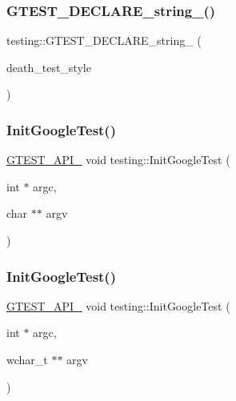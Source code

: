 \mbox{\label{namespacetesting_a37b7e87f0a5f502c6918f37d1768c1f3}} 
\subsubsection{\texorpdfstring{G\+T\+E\+S\+T\+\_\+\+D\+E\+C\+L\+A\+R\+E\+\_\+string\+\_\+()}{GTEST\_DECLARE\_string\_()}}
{\footnotesize\ttfamily testing\+::\+G\+T\+E\+S\+T\+\_\+\+D\+E\+C\+L\+A\+R\+E\+\_\+string\+\_\+ (\begin{DoxyParamCaption}\item[{death\+\_\+test\+\_\+style}]{ }\end{DoxyParamCaption})}

\mbox{\label{namespacetesting_aee3f6f99df893f576f705f66c0559482}} 
\subsubsection{\texorpdfstring{Init\+Google\+Test()}{InitGoogleTest()}\hspace{0.1cm}{\footnotesize\ttfamily [1/3]}}
{\footnotesize\ttfamily \hyperlink{gtest-port_8h_aa73be6f0ba4a7456180a94904ce17790}{G\+T\+E\+S\+T\+\_\+\+A\+P\+I\+\_\+} void testing\+::\+Init\+Google\+Test (\begin{DoxyParamCaption}\item[{int $\ast$}]{argc,  }\item[{char $\ast$$\ast$}]{argv }\end{DoxyParamCaption})}

\mbox{\label{namespacetesting_a6e9d83553f1d10818d698d45689d8adb}} 
\subsubsection{\texorpdfstring{Init\+Google\+Test()}{InitGoogleTest()}\hspace{0.1cm}{\footnotesize\ttfamily [2/3]}}
{\footnotesize\ttfamily \hyperlink{gtest-port_8h_aa73be6f0ba4a7456180a94904ce17790}{G\+T\+E\+S\+T\+\_\+\+A\+P\+I\+\_\+} void testing\+::\+Init\+Google\+Test (\begin{DoxyParamCaption}\item[{int $\ast$}]{argc,  }\item[{wchar\+\_\+t $\ast$$\ast$}]{argv }\end{DoxyParamCaption})}

